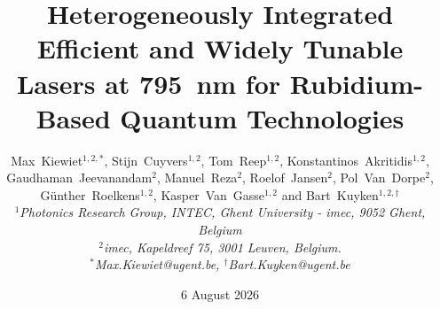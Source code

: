 \documentclass[%
 reprint,
 amsmath,amssymb,
 aps,
]{revtex4-2}
\begin{document}

\title{Heterogeneously Integrated Efficient and Widely Tunable Lasers at 795~nm for Rubidium-Based Quantum Technologies}





\author{Max~Kiewiet$^{1,2,*}$, Stijn~Cuyvers$^{1,2}$, Tom~Reep$^{1,2}$, Konstantinos~Akritidis$^{1,2}$, Gaudhaman~Jeevanandam$^{2}$, Manuel~Reza$^{2}$, Roelof~Jansen$^{2}$, Pol~Van~Dorpe$^{2}$, G\"unther~Roelkens$^{1,2}$, Kasper~Van~Gasse$^{1,2}$ and Bart~Kuyken$^{1,2,\dagger}$\\  
\vspace{+0.1 in}
\textit{\small{
$^1$Photonics Research Group, INTEC, Ghent University - imec, 9052 Ghent, Belgium\\
$^2$imec, Kapeldreef 75, 3001 Leuven, Belgium. \\
{\small $^*$Max.Kiewiet@ugent.be, $^\dagger$Bart.Kuyken@ugent.be}}}}

\date{6 August 2026}%
\end{document}
